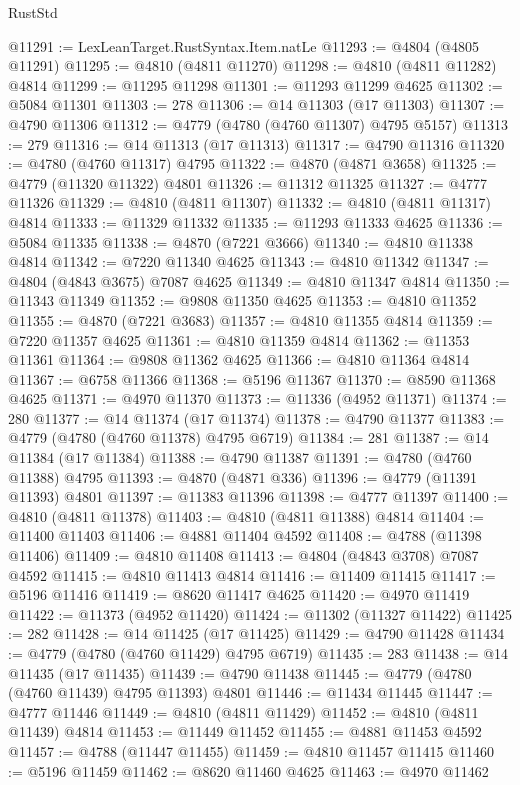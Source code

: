 \begin{lexlean}{RustStd}
\begin{coremodule}
@11291 := LexLeanTarget.RustSyntax.Item.natLe
@11293 := @4804 (@4805 @11291)
@11295 := @4810 (@4811 @11270)
@11298 := @4810 (@4811 @11282) @4814
@11299 := @11295 @11298
@11301 := @11293 @11299 @4625
@11302 := @5084 @11301
@11303 := 278
@11306 := @14 @11303 (@17 @11303)
@11307 := @4790 @11306
@11312 := @4779 (@4780 (@4760 @11307) @4795 @5157)
@11313 := 279
@11316 := @14 @11313 (@17 @11313)
@11317 := @4790 @11316
@11320 := @4780 (@4760 @11317) @4795
@11322 := @4870 (@4871 @3658)
@11325 := @4779 (@11320 @11322) @4801
@11326 := @11312 @11325
@11327 := @4777 @11326
@11329 := @4810 (@4811 @11307)
@11332 := @4810 (@4811 @11317) @4814
@11333 := @11329 @11332
@11335 := @11293 @11333 @4625
@11336 := @5084 @11335
@11338 := @4870 (@7221 @3666)
@11340 := @4810 @11338 @4814
@11342 := @7220 @11340 @4625
@11343 := @4810 @11342
@11347 := @4804 (@4843 @3675) @7087 @4625
@11349 := @4810 @11347 @4814
@11350 := @11343 @11349
@11352 := @9808 @11350 @4625
@11353 := @4810 @11352
@11355 := @4870 (@7221 @3683)
@11357 := @4810 @11355 @4814
@11359 := @7220 @11357 @4625
@11361 := @4810 @11359 @4814
@11362 := @11353 @11361
@11364 := @9808 @11362 @4625
@11366 := @4810 @11364 @4814
@11367 := @6758 @11366
@11368 := @5196 @11367
@11370 := @8590 @11368 @4625
@11371 := @4970 @11370
@11373 := @11336 (@4952 @11371)
@11374 := 280
@11377 := @14 @11374 (@17 @11374)
@11378 := @4790 @11377
@11383 := @4779 (@4780 (@4760 @11378) @4795 @6719)
@11384 := 281
@11387 := @14 @11384 (@17 @11384)
@11388 := @4790 @11387
@11391 := @4780 (@4760 @11388) @4795
@11393 := @4870 (@4871 @336)
@11396 := @4779 (@11391 @11393) @4801
@11397 := @11383 @11396
@11398 := @4777 @11397
@11400 := @4810 (@4811 @11378)
@11403 := @4810 (@4811 @11388) @4814
@11404 := @11400 @11403
@11406 := @4881 @11404 @4592
@11408 := @4788 (@11398 @11406)
@11409 := @4810 @11408
@11413 := @4804 (@4843 @3708) @7087 @4592
@11415 := @4810 @11413 @4814
@11416 := @11409 @11415
@11417 := @5196 @11416
@11419 := @8620 @11417 @4625
@11420 := @4970 @11419
@11422 := @11373 (@4952 @11420)
@11424 := @11302 (@11327 @11422)
@11425 := 282
@11428 := @14 @11425 (@17 @11425)
@11429 := @4790 @11428
@11434 := @4779 (@4780 (@4760 @11429) @4795 @6719)
@11435 := 283
@11438 := @14 @11435 (@17 @11435)
@11439 := @4790 @11438
@11445 := @4779 (@4780 (@4760 @11439) @4795 @11393) @4801
@11446 := @11434 @11445
@11447 := @4777 @11446
@11449 := @4810 (@4811 @11429)
@11452 := @4810 (@4811 @11439) @4814
@11453 := @11449 @11452
@11455 := @4881 @11453 @4592
@11457 := @4788 (@11447 @11455)
@11459 := @4810 @11457 @11415
@11460 := @5196 @11459
@11462 := @8620 @11460 @4625
@11463 := @4970 @11462

\end{coremodule}
\end{lexlean}
